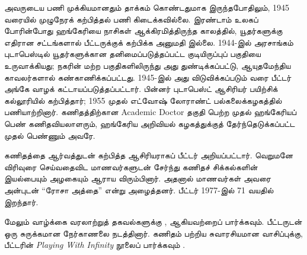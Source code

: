 \documentclass[../../../include/open-logic-section]{subfiles}
\begin{document}
அவருடைய பணி முக்கியமானதும் தாக்கம் கொண்டதுமாக இருந்தபோதிலும்,
1945 வரையில் முழுநேரக் கற்பித்தல் பணி கிடைக்கவில்லை. இரண்டாம் உலகப்
போரின்போது ஹங்கேரியை நாசிகள் ஆக்கிரமித்திருந்த காலத்தில், யூதர்களுக்கு
எதிரான சட்டங்களால் பீட்டருக்குக் கற்பிக்க அனுமதி இல்லை. 1944-இல்
அரசாங்கம் புடாபெஸ்டில் யூதர்களுக்கான தனிமைப்படுத்தப்பட்ட குடியிருப்புப்
பகுதியை உருவாக்கியது; நகரின் மற்ற பகுதிகளிலிருந்து அது துண்டிக்கப்பட்டு,
ஆயுதமேந்திய காவலர்களால் கண்காணிக்கப்பட்டது. 1945-இல் அது விடுவிக்கப்படும்
வரை பீட்டர் அங்கே வாழக் கட்டாயப்படுத்தப்பட்டார். பின்னர் புடாபெஸ்ட்
ஆசிரியர் பயிற்சிக் கல்லூரியில் கற்பித்தார்; 1955 முதல் எட்வோஷ்
லோராண்ட் பல்கலைக்கழகத்தில் பணியாற்றினார்.
கணிதத்திற்கான Academic Doctor தகுதி பெற்ற முதல் ஹங்கேரியப் பெண்
கணிதவியலாளரும், ஹங்கேரிய
அறிவியல் கழகத்துக்குத் தேர்ந்தெடுக்கப்பட்ட முதல் பெண்ணும் அவரே.

கணிதத்தை ஆர்வத்துடன் கற்பித்த ஆசிரியராகப் பீட்டர் அறியப்பட்டார்.
வெறுமனே விரிவுரை செய்வதைவிட மாணவர்களுடன் சேர்ந்து கணிதச் சிக்கல்களின்
இயல்பையும் அழகையும் ஆராய விரும்பினார். அதனால் மாணவர்கள் அவரை
அன்புடன் ``ரோசா அத்தை'' என்று அழைத்தனர். பீட்டர் 1977-இல்
71 வயதில் இறந்தார்.

\begin{reading}
மேலும் வாழ்க்கை வரலாற்றுத் தகவல்களுக்கு \citep{Oconnor2014},
\citep{Andrasfai1986} ஆகியவற்றைப் பார்க்கவும். \citet{Tamassy1994}
பீட்டருடன் ஒரு சுருக்கமான நேர்காணலை நடத்தினார். கணிதம் பற்றிய
சுவாரசியமான வாசிப்புக்கு, பீட்டரின் \emph{Playing With Infinity}
நூலைப் பார்க்கவும் \citep{Peter2010}.
\end{reading}
\end{document}
